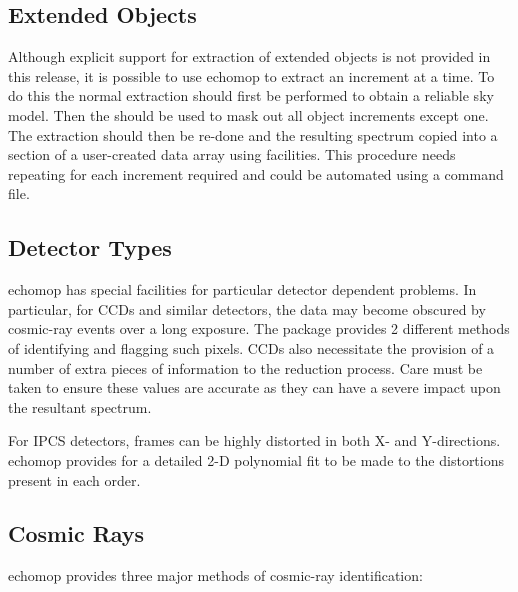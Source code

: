 \subsection{Extended Objects}

Although explicit support for extraction of extended objects is not
provided in this release, it is possible to use {\sc echomop} to extract
an increment at a time.  To do this the normal extraction should first be
performed to obtain a reliable sky model.  Then the 
should be used to mask out all object increments except
one.  The extraction should then be re-done and the resulting spectrum copied
into a section of a user-created data array using
 facilities.
This procedure needs repeating for each increment required and could be
automated using a command file.


\subsection{Detector Types}

{\sc echomop} has special facilities for particular detector dependent
problems. In particular, for CCDs and similar detectors, the data may
become obscured by cosmic-ray events over a long exposure. The package
provides 2 different methods of identifying and flagging such pixels. CCDs
also necessitate the provision of a number of extra pieces of information
to the reduction process. Care must be taken to ensure these values are
accurate as they can have a severe impact upon the resultant spectrum.

For IPCS detectors, frames can be highly distorted in both X- and
Y-directions.  {\sc echomop} provides for a detailed 2-D polynomial fit to be
made to the distortions present in each order.


\subsection{Cosmic Rays}

{\sc echomop} provides three major methods of cosmic-ray identification:

